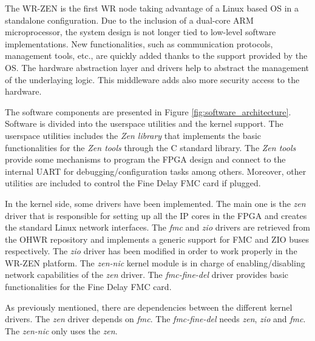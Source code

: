 The WR-ZEN is the first WR node taking advantage of a Linux based OS in a standalone configuration.  
Due to the inclusion of a dual-core ARM microprocessor, the system design is not longer tied to low-level software implementations. New functionalities, such as communication protocols, management tools, etc., are quickly added thanks to the support provided by the OS. The hardware abstraction layer and drivers help to abstract the management of the underlaying logic. This middleware adds also more security access to the hardware.

The software components are presented in Figure
\ref{fig:software_architecture}. Software is divided into the userspace utilities and the kernel support. The userspace utilities includes the \textit{Zen library} that implements the basic functionalities for the \textit{Zen tools} through the C standard library. The \textit{Zen tools} provide some mechanisms to program the FPGA design and connect to the internal UART for debugging/configuration tasks among others.  Moreover, other utilities are included to control the Fine Delay FMC card if plugged.

In the kernel side, some drivers have been implemented. The main one is the
\textit{zen} driver that is responsible for setting up all the IP cores in the
FPGA and creates the standard Linux network interfaces. The \textit{fmc} and
\textit{zio} drivers are retrieved from the OHWR repository and implements a
generic support for FMC and ZIO buses respectively.  The \textit{zio} driver
has been modified in order to work properly in the WR-ZEN platform.  The
\textit{zen-nic} kernel module is in charge of enabling/disabling network
capabilities of the \textit{zen} driver. The \textit{fmc-fine-del} driver
provides basic functionalities for the Fine Delay FMC card.

As previously mentioned, there are dependencies between the different kernel
drivers. The \textit{zen} driver depends
on \textit{fmc}. The \textit{fmc-fine-del} needs \textit{zen}, \textit{zio} and
\textit{fmc}. The \textit{zen-nic} only uses the \textit{zen}.

